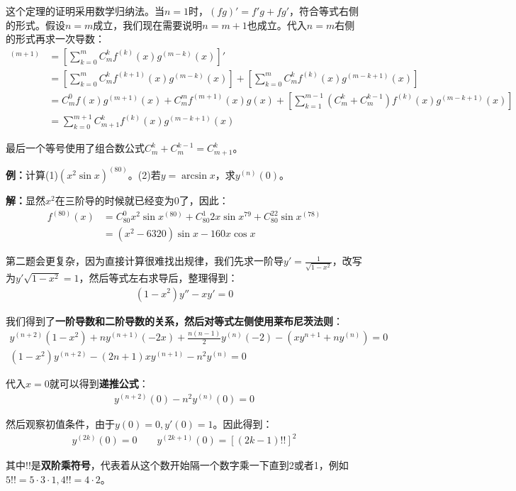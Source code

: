 \documentclass{ctexart}
\let\oldtextbf\textbf %
\renewcommand{\textbf}[1]{\textcolor{btex}{\oldtextbf{#1}}} %
\begin{document}
这个定理的证明采用数学归纳法。当$n=1$时，$(fg)'=f'g+fg'$，符合等式右侧的形式。假设$n=m$成立，我们现在需要说明$n=m+1$也成立。代入$n=m$右侧的形式再求一次导数：
\begin{align*}
    [f(x)g(x)]^{(m+1)}&=\left[\sum_{k=0}^m C_m^kf^{(k)}(x)g^{(m-k)}(x)\right]'\\
&=\left[\sum_{k=0}^m C_m^kf^{(k+1)}(x)g^{(m-k)}(x)\right]+\left[\sum_{k=0}^m C_m^kf^{(k)}(x)g^{(m-k+1)}(x)\right]\\
&=C_m^0 f(x)g^{(m+1)}(x)+C_m^m f^{(m+1)}(x)g(x)+\left[\sum_{k=1}^{m-1}(C_m^k+C_{m}^{k-1})f^{(k)}(x)g^{(m-k+1)}(x)\right]\\
&=\sum_{k=0}^{m+1} C_{m+1}^kf^{(k)}(x)g^{(m-k+1)}(x)
\end{align*}

最后一个等号使用了组合数公式$C_m^k+C_{m}^{k-1}=C_{m+1}^k$。

\textbf{例：}计算(1)$(x^2\sin x)^{(80)}$。(2)若$y=\arcsin x$，求$y^{(n)}(0)$。

\textbf{解：}显然$x^2$在三阶导的时候就已经变为0了，因此：
\begin{align*}
    f^{(80)}(x)&=C_{80}^0x^2\sin x^{(80)}+C_{80}^1 2x\sin x^{79}+C_{80}^22\sin x^{(78)}\\
    &=(x^2-6320)\sin x-160x\cos x
\end{align*}

第二题会更复杂，因为直接计算很难找出规律，我们先求一阶导$y'=\frac{1}{\sqrt{1-x^2}}$，改写为$y'\sqrt{1-x^2}=1$，然后等式左右求导后，整理得到：
\begin{align*}
    (1-x^2)y''-xy'=0
\end{align*}

我们得到了\textbf{一阶导数和二阶导数的关系，然后对等式左侧使用莱布尼茨法则}：
\begin{gather*}
    y^{(n+2)}(1-x^2)+ny^{(n+1)}(-2x)+\frac{n(n-1)}{2}y^{(n)}(-2)-(xy^{n+1}+ny^{(n)})=0\\
(1-x^2)y^{(n+2)}-(2n+1)xy^{(n+1)}-n^2y^{(n)}=0 
\end{gather*}

代入$x=0$就可以得到\textbf{递推公式}：
\begin{align*}
    y^{(n+2)}(0)-n^2y^{(n)}(0)=0
\end{align*}

然后观察初值条件，由于$y(0)=0,y'(0)=1$。因此得到：
\begin{align*}
    y^{(2k)}(0)=0\qquad y^{(2k+1)}(0)=[(2k-1)!!]^2
\end{align*}

其中$!!$是\textbf{双阶乘符号}，代表着从这个数开始隔一个数字乘一下直到2或者1，例如$5!!=5\cdot 3\cdot1,4!!=4\cdot 2$。
\end{document}
